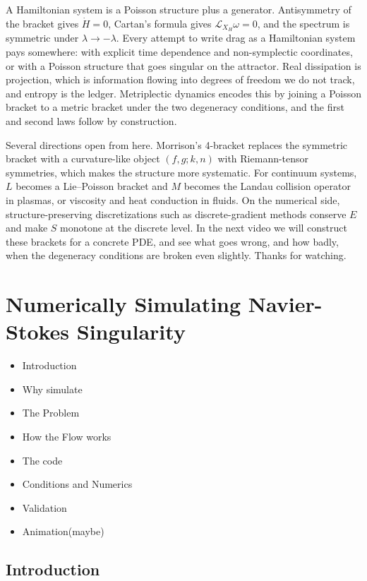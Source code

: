 A Hamiltonian system is a Poisson structure plus a generator. Antisymmetry of the bracket gives $\dot H = 0$, Cartan's formula gives $\mathcal{L}_{X_H}\omega = 0$, and the spectrum is symmetric under $\lambda\to-\lambda$. Every attempt to write drag as a Hamiltonian system pays somewhere: with explicit time dependence and non-symplectic coordinates, or with a Poisson structure that goes singular on the attractor. Real dissipation is projection, which is information flowing into degrees of freedom we do not track, and entropy is the ledger. Metriplectic dynamics encodes this by joining a Poisson bracket to a metric bracket under the two degeneracy conditions, and the first and second laws follow by construction.

Several directions open from here. Morrison's 4-bracket replaces the symmetric bracket with a curvature-like object $(f,g;k,n)$ with Riemann-tensor symmetries, which makes the structure more systematic. For continuum systems, $L$ becomes a Lie--Poisson bracket and $M$ becomes the Landau collision operator in plasmas, or viscosity and heat conduction in fluids. On the numerical side, structure-preserving discretizations such as discrete-gradient methods conserve $E$ and make $S$ monotone at the discrete level. In the next video we will construct these brackets for a concrete PDE, and see what goes wrong, and how badly, when the degeneracy conditions are broken even slightly. Thanks for watching.




\section{Numerically Simulating Navier-Stokes Singularity}

\begin{itemize}
	\item Introduction
	\item Why simulate
	\item The Problem
	\item How the Flow works
	\item The code
	\item Conditions and Numerics
	\item Validation
	\item Animation(maybe)
\end{itemize}

\subsection{Introduction}

